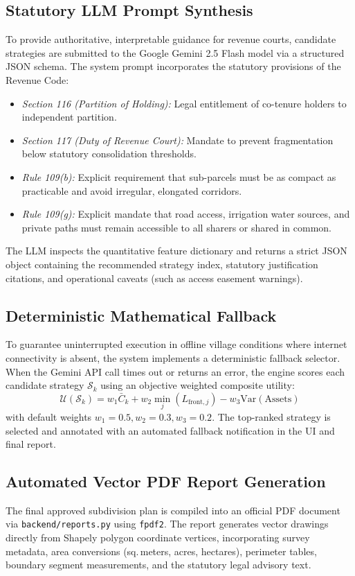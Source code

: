 \documentclass[conference]{IEEEtran}
\begin{document}
\subsection{Statutory LLM Prompt Synthesis}
To provide authoritative, interpretable guidance for revenue courts, candidate strategies are submitted to the Google Gemini 2.5 Flash model via a structured JSON schema. The system prompt incorporates the statutory provisions of the Revenue Code:
\begin{itemize}
    \item \textit{Section 116 (Partition of Holding):} Legal entitlement of co-tenure holders to independent partition.
    \item \textit{Section 117 (Duty of Revenue Court):} Mandate to prevent fragmentation below statutory consolidation thresholds.
    \item \textit{Rule 109(b):} Explicit requirement that sub-parcels must be as compact as practicable and avoid irregular, elongated corridors.
    \item \textit{Rule 109(g):} Explicit mandate that road access, irrigation water sources, and private paths must remain accessible to all sharers or shared in common.
\end{itemize}

The LLM inspects the quantitative feature dictionary and returns a strict JSON object containing the recommended strategy index, statutory justification citations, and operational caveats (such as access easement warnings).

\subsection{Deterministic Mathematical Fallback}
To guarantee uninterrupted execution in offline village conditions where internet connectivity is absent, the system implements a deterministic fallback selector. When the Gemini API call times out or returns an error, the engine scores each candidate strategy $\mathcal{S}_k$ using an objective weighted composite utility:
\begin{equation}
    \mathcal{U}(\mathcal{S}_k) = w_1 \bar{C}_k + w_2 \min_j (L_{\text{front}, j}) - w_3 \text{Var}(\text{Assets})
\end{equation}
with default weights $w_1 = 0.5, w_2 = 0.3, w_3 = 0.2$. The top-ranked strategy is selected and annotated with an automated fallback notification in the UI and final report.

\subsection{Automated Vector PDF Report Generation}
The final approved subdivision plan is compiled into an official PDF document via \texttt{backend/reports.py} using \texttt{fpdf2}. The report generates vector drawings directly from Shapely polygon coordinate vertices, incorporating survey metadata, area conversions (sq.\,meters, acres, hectares), perimeter tables, boundary segment measurements, and the statutory legal advisory text.
\end{document}
